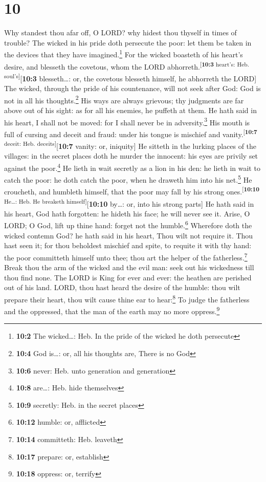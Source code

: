 \hypertarget{section-9}{%
\section{10}\label{section-9}}

 Why standest thou afar off, O LORD? why hidest thou
thyself in times of trouble?  The wicked in his pride doth
persecute the poor: let them be taken in the devices that they have
imagined.\footnote{\textbf{10:2} The wicked\ldots: Heb. In the pride of
  the wicked he doth persecute}  For the wicked boasteth
of his heart's desire, and blesseth the covetous, whom the LORD
abhorreth.\textsuperscript{{[}\textbf{10:3} heart's: Heb.
soul's{]}}{[}\textbf{10:3} blesseth\ldots: or, the covetous blesseth
himself, he abhorreth the LORD{]}  The wicked, through the
pride of his countenance, will not seek after God: God is not in all his
thoughts.\footnote{\textbf{10:4} God is\ldots: or, all his thoughts are,
  There is no God}  His ways are always grievous; thy
judgments are far above out of his sight: as for all his enemies, he
puffeth at them.  He hath said in his heart, I shall not
be moved: for I shall never be in adversity.\footnote{\textbf{10:6}
  never: Heb. unto generation and generation}  His mouth
is full of cursing and deceit and fraud: under his tongue is mischief
and vanity.\textsuperscript{{[}\textbf{10:7} deceit: Heb.
deceits{]}}{[}\textbf{10:7} vanity: or, iniquity{]}  He
sitteth in the lurking places of the villages: in the secret places doth
he murder the innocent: his eyes are privily set against the
poor.\footnote{\textbf{10:8} are\ldots: Heb. hide themselves}
 He lieth in wait secretly as a lion in his den: he lieth
in wait to catch the poor: he doth catch the poor, when he draweth him
into his net.\footnote{\textbf{10:9} secretly: Heb. in the secret places}
 He croucheth, and humbleth himself, that the poor may
fall by his strong ones.\textsuperscript{{[}\textbf{10:10} He\ldots:
Heb. He breaketh himself{]}}{[}\textbf{10:10} by\ldots: or, into his
strong parts{]}  He hath said in his heart, God hath
forgotten: he hideth his face; he will never see it. 
Arise, O LORD; O God, lift up thine hand: forget not the
humble.\footnote{\textbf{10:12} humble: or, afflicted} 
Wherefore doth the wicked contemn God? he hath said in his heart, Thou
wilt not require it.  Thou hast seen it; for thou
beholdest mischief and spite, to requite it with thy hand: the poor
committeth himself unto thee; thou art the helper of the
fatherless.\footnote{\textbf{10:14} committeth: Heb. leaveth}
 Break thou the arm of the wicked and the evil man: seek
out his wickedness till thou find none.  The LORD is King
for ever and ever: the heathen are perished out of his land.
 LORD, thou hast heard the desire of the humble: thou
wilt prepare their heart, thou wilt cause thine ear to hear:\footnote{\textbf{10:17}
  prepare: or, establish}  To judge the fatherless and
the oppressed, that the man of the earth may no more oppress.\footnote{\textbf{10:18}
  oppress: or, terrify}

